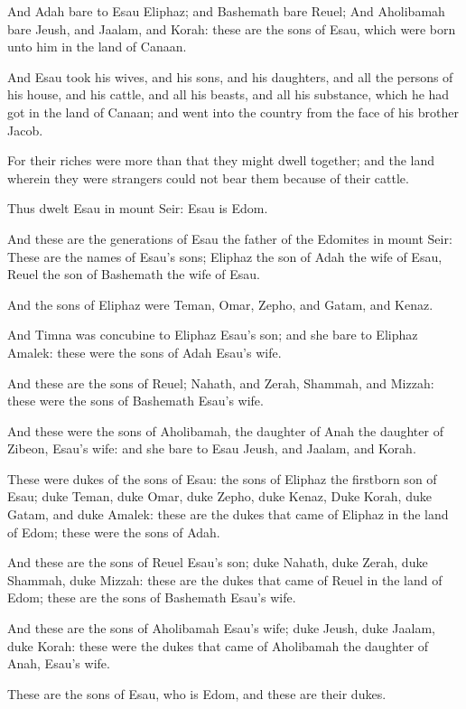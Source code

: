 \verse And Adah bare to Esau Eliphaz; and Bashemath bare Reuel; \verse And Aholibamah bare Jeush, and Jaalam, and Korah: these are the sons of Esau, which were born unto him in the land of Canaan.

\verse And Esau took his wives, and his sons, and his daughters, and all the persons of his house, and his cattle, and all his beasts, and all his substance, which he had got in the land of Canaan; and went into the country from the face of his brother Jacob.

\verse For their riches were more than that they might dwell together; and the land wherein they were strangers could not bear them because of their cattle.

\verse Thus dwelt Esau in mount Seir: Esau is Edom.

\verse And these are the generations of Esau the father of the Edomites in mount Seir: \verse These are the names of Esau's sons; Eliphaz the son of Adah the wife of Esau, Reuel the son of Bashemath the wife of Esau.

\verse And the sons of Eliphaz were Teman, Omar, Zepho, and Gatam, and Kenaz.

\verse And Timna was concubine to Eliphaz Esau's son; and she bare to Eliphaz Amalek: these were the sons of Adah Esau's wife.

\verse And these are the sons of Reuel; Nahath, and Zerah, Shammah, and Mizzah: these were the sons of Bashemath Esau's wife.

\verse And these were the sons of Aholibamah, the daughter of Anah the daughter of Zibeon, Esau's wife: and she bare to Esau Jeush, and Jaalam, and Korah.

\verse These were dukes of the sons of Esau: the sons of Eliphaz the firstborn son of Esau; duke Teman, duke Omar, duke Zepho, duke Kenaz, \verse Duke Korah, duke Gatam, and duke Amalek: these are the dukes that came of Eliphaz in the land of Edom; these were the sons of Adah.

\verse And these are the sons of Reuel Esau's son; duke Nahath, duke Zerah, duke Shammah, duke Mizzah: these are the dukes that came of Reuel in the land of Edom; these are the sons of Bashemath Esau's wife.

\verse And these are the sons of Aholibamah Esau's wife; duke Jeush, duke Jaalam, duke Korah: these were the dukes that came of Aholibamah the daughter of Anah, Esau's wife.

\verse These are the sons of Esau, who is Edom, and these are their dukes.

